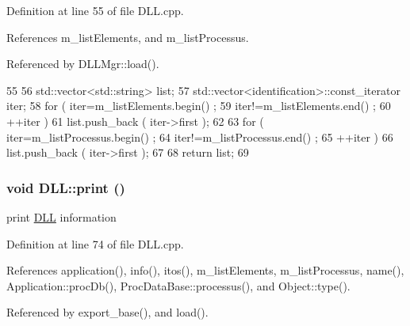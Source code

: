 Definition at line 55 of file DLL.cpp.

References m\_\-listElements, and m\_\-listProcessus.

Referenced by DLLMgr::load().


\begin{DoxyCode}
55                                        {
56   std::vector<std::string> list;
57   std::vector<identification>::const_iterator iter;
58   for ( iter=m_listElements.begin() ;
59         iter!=m_listElements.end() ;
60         ++iter ) {
61     list.push_back ( iter->first );
62   }
63   for ( iter=m_listProcessus.begin() ;
64         iter!=m_listProcessus.end() ;
65         ++iter ) {
66     list.push_back ( iter->first );
67   }
68   return list;
69 }
\end{DoxyCode}
\hypertarget{classDLL_ae45f8b4b291e9da806f4921dd7468cfc}{
\subsubsection[{print}]{\setlength{\rightskip}{0pt plus 5cm}void DLL::print ()}}
\label{classDLL_ae45f8b4b291e9da806f4921dd7468cfc}
print \hyperlink{classDLL}{DLL} information 

Definition at line 74 of file DLL.cpp.

References application(), info(), itos(), m\_\-listElements, m\_\-listProcessus, name(), Application::procDb(), ProcDataBase::processus(), and Object::type().

Referenced by export\_\-base(), and load().


